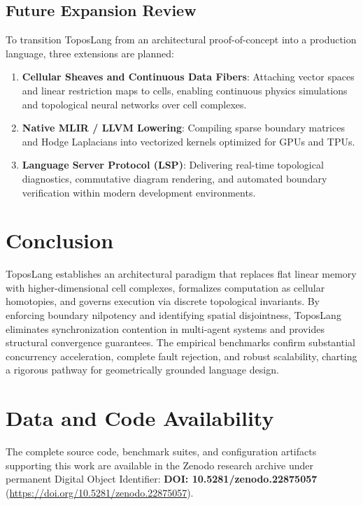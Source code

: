 \documentclass[10pt,a4paper]{article}
\begin{document}
\subsection{Future Expansion Review}
To transition ToposLang from an architectural proof-of-concept into a production language, three extensions are planned:
\begin{enumerate}
    \item \textbf{Cellular Sheaves and Continuous Data Fibers}: Attaching vector spaces and linear restriction maps to cells, enabling continuous physics simulations and topological neural networks over cell complexes.
    \item \textbf{Native MLIR / LLVM Lowering}: Compiling sparse boundary matrices and Hodge Laplacians into vectorized kernels optimized for GPUs and TPUs.
    \item \textbf{Language Server Protocol (LSP)}: Delivering real-time topological diagnostics, commutative diagram rendering, and automated boundary verification within modern development environments.
\end{enumerate}

\section{Conclusion}
ToposLang establishes an architectural paradigm that replaces flat linear memory with higher-dimensional cell complexes, formalizes computation as cellular homotopies, and governs execution via discrete topological invariants. By enforcing boundary nilpotency and identifying spatial disjointness, ToposLang eliminates synchronization contention in multi-agent systems and provides structural convergence guarantees. The empirical benchmarks confirm substantial concurrency acceleration, complete fault rejection, and robust scalability, charting a rigorous pathway for geometrically grounded language design.

\section*{Data and Code Availability}
The complete source code, benchmark suites, and configuration artifacts supporting this work are available in the Zenodo research archive under permanent Digital Object Identifier: \textbf{DOI: 10.5281/zenodo.22875057} (\url{https://doi.org/10.5281/zenodo.22875057}).
\end{document}
